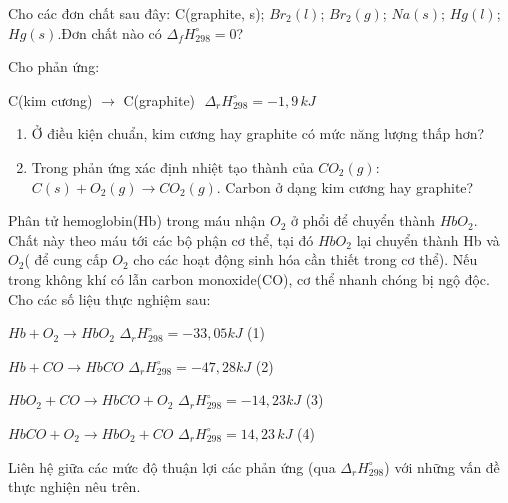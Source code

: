 \documentclass[Main.tex]{subfiles}
\begin{document}
	\begin{bt} Cho các đơn chất sau đây: C(graphite, s); $Br_2(l)$; $Br_2(g)$; $Na(s)$; $Hg(l)$; $Hg(s)$.Đơn chất nào có $\Delta_f H_{298}^\circ = 0$?
	\end{bt}
	\begin{bt} Cho phản ứng:
		
		C(kim cương) $\longrightarrow$ C(graphite)\,\, $\Delta_r H_{298}^\circ = -1{,}9\, kJ$
		\begin{enumerate}
			\item[(a)] Ở điều kiện chuẩn, kim cương hay graphite có mức năng lượng thấp hơn?
			\item[(b)] Trong phản ứng xác định nhiệt tạo thành của $CO_2(g)$: $C(s) + O_2(g) \longrightarrow CO_2(g)$. Carbon ở dạng kim cương hay graphite?
		\end{enumerate}
	\end{bt}
	\begin{bt}
		[CD - SBT] Phân tử hemoglobin(Hb) trong máu nhận $O_2$ ở phổi để chuyển thành $HbO_2$. Chất này theo máu tới các bộ phận cơ thể, tại đó $HbO_2$ lại chuyển thành Hb và $O_2$( để cung cấp $O_2$ cho các hoạt động sinh hóa cần thiết trong cơ thể). Nếu trong không khí có lẫn carbon monoxide(CO), cơ thể nhanh chóng bị ngộ độc. Cho các số liệu thực nghiệm sau:
		
		$Hb + O_2 \longrightarrow HbO_2 \,\, \Delta_r H_{298}^\circ = -33{,}05kJ$  (1)
		
		$Hb + CO \longrightarrow HbCO \,\, \Delta_r H_{298}^\circ = -47{,}28kJ$ (2)
		
		$HbO_2 + CO \longrightarrow HbCO + O_2 \,\, \Delta_r H_{298}^\circ = -14{,}23kJ$ (3)
		
		$HbCO + O_2 \longrightarrow HbO_2 + CO \,\, \Delta_r H_{298}^\circ = 14{,}23\, kJ$ (4)
		
		Liên hệ giữa các mức độ thuận lợi các phản ứng (qua $\Delta_r H_{298}^\circ$) với những vấn đề thực nghiện nêu trên.
	\end{bt}
\end{document}
